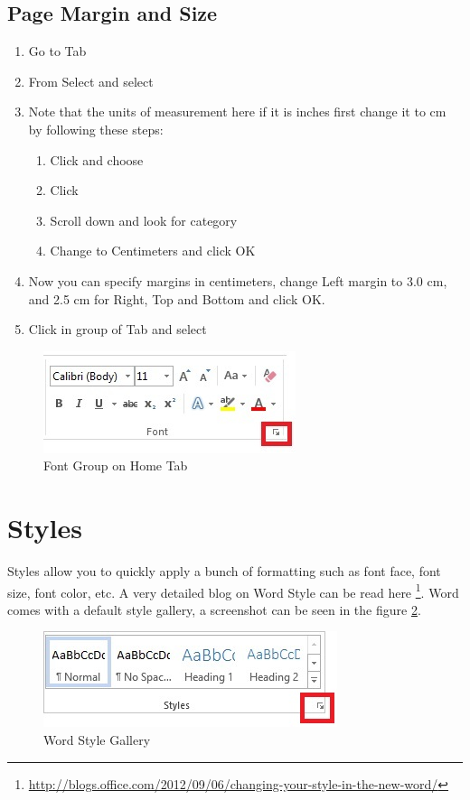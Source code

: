 \subsection{Page Margin and Size} 
\begin{enumerate}
\item Go to  Tab 
\item From  Select  and select 
\item Note that the units of measurement here if it is inches first change it to cm by following these steps:
    \begin{enumerate}
    \item Click  and choose 
    \item Click 
    \item Scroll down and look for  category
    \item Change  to Centimeters and click OK
    \end{enumerate}
\item Now you can specify margins in centimeters, change Left margin to 3.0 cm, and 2.5 cm for Right, Top and Bottom and click OK.
\item Click  in  group of  Tab and select 
\end{enumerate}
\begin{figure}
    \centering
    \includegraphics{./Figures/homefont.jpg}
    \caption{Font Group on Home Tab}
    \label{fig:homefont}
\end{figure}

\section{Styles}
\label{sec:styles}
Styles allow you to quickly apply a bunch of formatting such as font face, font size, font color, etc. A very detailed blog on Word Style can be read here \footnote{\url{http://blogs.office.com/2012/09/06/changing-your-style-in-the-new-word/}}. Word comes with a default style gallery, a screenshot can be seen in the figure \ref{fig:stylegallery}.
\begin{figure}[h]
    \centering
    \includegraphics{./Figures/styledefine.jpg}
    \caption{Word Style Gallery}
    \label{fig:stylegallery}
\end{figure}
